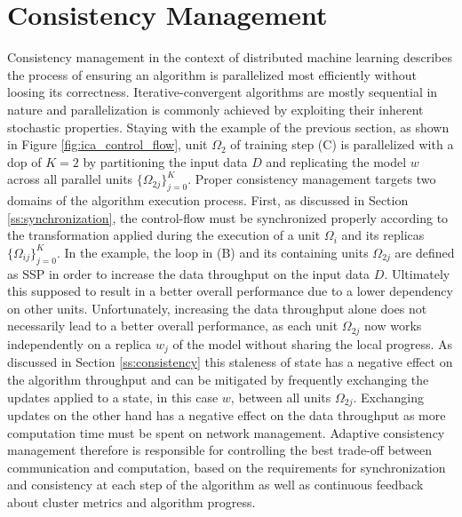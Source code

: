 
\chapter{Consistency Management}
\label{c:consistency_mgmt}
Consistency management in the context of distributed machine learning describes the process of ensuring an algorithm is parallelized most efficiently without loosing its correctness.
Iterative-convergent algorithms are mostly sequential in nature and parallelization is commonly achieved by exploiting their inherent stochastic properties.
Staying with the example of the previous section, as shown in Figure \ref{fig:ica_control_flow}, unit $\Omega_2$ of training step (C) is parallelized with a dop of $K = 2$ by partitioning the input data $D$ and replicating the model $w$ across all parallel units $\{\Omega_{2j}\}_{j=0}^K$.
Proper consistency management targets two domains of the algorithm execution process.
First, as discussed in Section \ref{ss:synchronization}, the control-flow must be synchronized properly according to the transformation applied during the execution of a unit $\Omega_i$ and its replicas $\{\Omega_{ij}\}_{j=0}^K$.
In the example, the loop in (B) and its containing units $\Omega_{2j}$ are defined as SSP in order to increase the data throughput on the input data $D$.
Ultimately this supposed to result in a better overall performance due to a lower dependency on other units.
Unfortunately, increasing the data throughput alone does not necessarily lead to a better overall performance, as each unit $\Omega_{2j}$ now works independently on a replica $w_j$ of the model without sharing the local progress.
As discussed in Section \ref{ss:consistency} this staleness of state has a negative effect on the algorithm throughput and can be mitigated by frequently exchanging the updates applied to a state, in this case $w$, between all units $\Omega_{2j}$.
Exchanging updates on the other hand has a negative effect on the data throughput as more computation time must be spent on network management.
Adaptive consistency management therefore is responsible for controlling the best trade-off between communication and computation, based on the requirements for synchronization and consistency at each step of the algorithm as well as continuous feedback about cluster metrics and algorithm progress.

